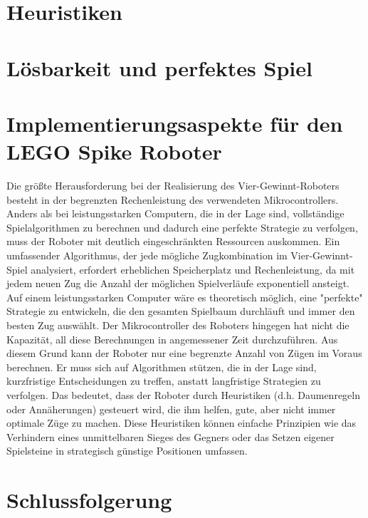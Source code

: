 \section{Heuristiken}

\section{Lösbarkeit und perfektes Spiel}

\section{Implementierungsaspekte für den LEGO Spike Roboter}
Die größte Herausforderung bei der Realisierung des Vier-Gewinnt-Roboters besteht in der begrenzten Rechenleistung des verwendeten Mikrocontrollers. Anders als bei leistungsstarken Computern, die in der Lage sind, vollständige Spielalgorithmen zu berechnen und dadurch eine perfekte Strategie zu verfolgen, muss der Roboter mit deutlich eingeschränkten Ressourcen auskommen.
Ein umfassender Algorithmus, der jede mögliche Zugkombination im Vier-Gewinnt-Spiel analysiert, erfordert erheblichen Speicherplatz und Rechenleistung, da mit jedem neuen Zug die Anzahl der möglichen Spielverläufe exponentiell ansteigt. Auf einem leistungsstarken Computer wäre es theoretisch möglich, eine "perfekte" Strategie zu entwickeln, die den gesamten Spielbaum durchläuft und immer den besten Zug auswählt. Der Mikrocontroller des Roboters hingegen hat nicht die Kapazität, all diese Berechnungen in angemessener Zeit durchzuführen.
Aus diesem Grund kann der Roboter nur eine begrenzte Anzahl von Zügen im Voraus berechnen. Er muss sich auf Algorithmen stützen, die in der Lage sind, kurzfristige Entscheidungen zu treffen, anstatt langfristige Strategien zu verfolgen. Das bedeutet, dass der Roboter durch Heuristiken (d.h. Daumenregeln oder Annäherungen) gesteuert wird, die ihm helfen, gute, aber nicht immer optimale Züge zu machen. Diese Heuristiken können einfache Prinzipien wie das Verhindern eines unmittelbaren Sieges des Gegners oder das Setzen eigener Spielsteine in strategisch günstige Positionen umfassen.
\section{Schlussfolgerung}